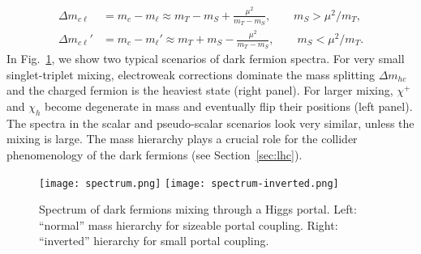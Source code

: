 \documentclass[nofootinbib,prd,aps,superscriptaddress,preprintnumbers]{revtex4}
\begin{document}
\begin{align}
\Delta m_{c\ell} & = m_c - m_\ell \approx m_T - m_S + \frac{\mu^2}{m_T - m_S},\qquad m_S > \mu^2/m_T,\\\nonumber
\Delta m_{c\ell}' & = m_c - m_\ell' \approx m_T + m_S - \frac{\mu^2}{m_T - m_S},\qquad m_S < \mu^2/m_T.
\end{align}
In Fig.~\ref{fig:spectrum}, we show two typical scenarios of dark fermion spectra. For very small singlet-triplet mixing, electroweak corrections dominate the mass splitting $\Delta m_{hc}$ and the charged fermion is the heaviest state (right panel). For larger mixing, $\chi^+$ and $\chi_h$ become degenerate in mass and eventually flip their positions (left panel). The spectra in the scalar and pseudo-scalar scenarios look very similar, unless the mixing is large. The mass hierarchy plays a crucial role for the collider phenomenology of the dark fermions (see Section~\ref{sec:lhc}).
\begin{figure}[!t]
\centering
\texttt{[image: spectrum.png]} \hspace*{1.5cm} \texttt{[image: spectrum-inverted.png]}
\vspace*{0.2cm}
\caption{\label{fig:spectrum} Spectrum of dark fermions mixing through a Higgs portal. Left: ``normal'' mass hierarchy for sizeable portal coupling. Right: ``inverted'' hierarchy for small portal coupling.}
\end{figure}

\end{document}
